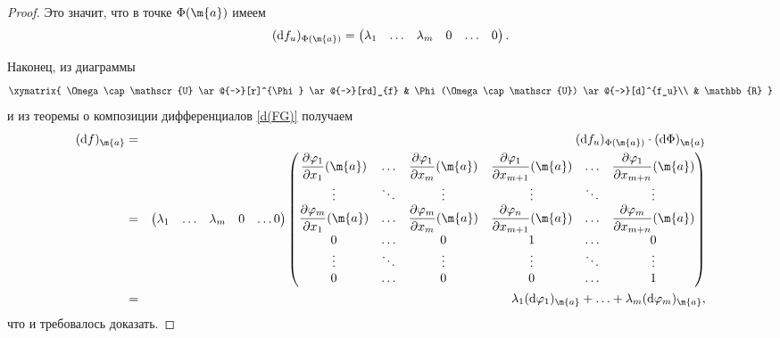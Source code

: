 \begin{proof}
Это значит, что в точке $\Phi(\m{a})$ имеем
\[
 (\mathrm{d}f_u)_{\Phi(\m{a})} = \begin{pmatrix}
     \lambda_1 & \ldots & \lambda_m & 0 & \ldots & 0
 \end{pmatrix}.
\]

Наконец, из диаграммы
\[
 \xymatrix{
 \Omega \cap \mathscr{U} \ar@{->}[r]^{\Phi} \ar@{->}[rd]_{f} & \Phi(\Omega \cap \mathscr{U}) \ar@{->}[d]^{f_u}\\
 & \mathbb{R}
 }
\]
и из теоремы о композиции дифференциалов \ref{d(FG)} получаем
\begin{eqnarray*}
    (\mathrm{d}f)_\m{a} &=& (\mathrm{d}f_u)_{\Phi(\m{a})} \cdot (\mathrm{d}\Phi)_{\m{a}} \\
    &=& \begin{pmatrix}
        \lambda_1 & \ldots & \lambda_m & 0 & \ldots 0
    \end{pmatrix} \begin{pmatrix}
        \dfrac{\partial \varphi_1}{\partial x_1}(\m{a}) & \ldots & \dfrac{\partial \varphi_1}{\partial x_m}(\m{a}) & \dfrac{\partial \varphi_1}{\partial x_{m+1}}(\m{a}) & \ldots & \dfrac{\partial \varphi_1}{\partial x_{m+n}}(\m{a}) \\
        \vdots & \ddots & \vdots & \vdots & \ddots & \vdots\\
        \dfrac{\partial \varphi_m}{\partial x_1}(\m{a}) & \ldots & \dfrac{\partial \varphi_m}{\partial x_m}(\m{a}) & \dfrac{\partial \varphi_n}{\partial x_{m+1}}(\m{a}) & \ldots & \dfrac{\partial \varphi_m}{\partial x_{m+n}}(\m{a}) \\
        0 & \ldots & 0 & 1 & \ldots &0 \\
        \vdots & \ddots & \vdots & \vdots & \ddots & \vdots\\
        0 & \ldots & 0 & 0 & \ldots & 1
    \end{pmatrix} \\
    &=& \lambda_1 (\mathrm{d}\varphi_1)_{\m{a}} + \ldots + \lambda_m (\mathrm{d}\varphi_m)_{\m{a}},
\end{eqnarray*}
что и требовалось доказать.
\end{proof}
